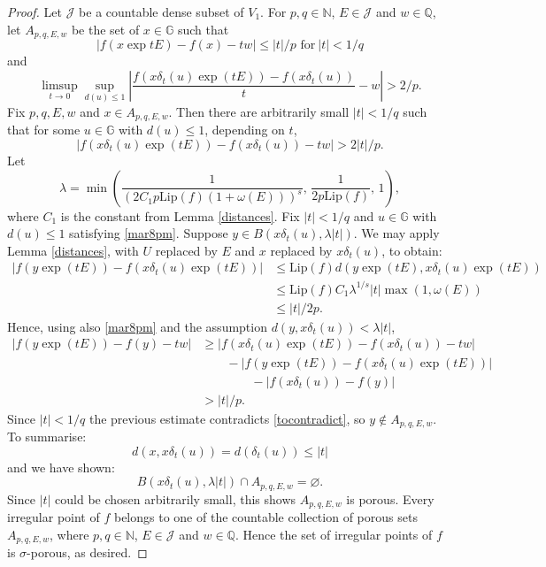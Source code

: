 \documentclass[reqno, 11pt]{amsart}
\theoremstyle{definition}
\theoremstyle{remark}
\numberwithin{theorem}{section}
\numberwithin{equation}{section}
\begin{document}
\begin{proof}
Let $\mathcal{J}$ be a countable dense subset of $V_{1}$. For $p,q\in \mathbb{N}$, $E \in \mathcal{J}$ and $w\in \mathbb{Q}$, let $A_{p,q,E,w}$ be the set of $x\in \mathbb{G}$ such that
\begin{equation}\label{tocontradict} |f(x\exp tE)-f(x)-tw| \leq |t|/p \mbox{ for}\  |t|<1/q\end{equation}
and
\[\limsup_{t\to 0} \sup_{d(u)\leq 1} \left| \frac{f(x\delta_{t}(u)\exp(tE))-f(x\delta_{t}(u))}{t} - w\right| > 2/p.\]
Fix $p,q,E,w$ and $x\in A_{p,q,E,w}$. Then there are arbitrarily small $|t|<1/q$ such that for some $u\in \mathbb{G}$ with $d(u)\leq 1$, depending on $t$,
\begin{equation}\label{mar8pm}|f(x\delta_{t}(u)\exp(tE))-f(x\delta_{t}(u))-tw|>2|t|/p.\end{equation}
Let
\[\lambda=\min \left( \frac{1}{(2C_{1}p\mathrm{Lip}(f)(1+\omega(E)))^{s}},\, \frac{1}{2p\mathrm{Lip}(f)},\, 1\right),\]
where $C_{1}$ is the constant from Lemma \ref{distances}. Fix $|t|<1/q$ and $u\in \mathbb{G}$ with $d(u)\leq 1$ satisfying \eqref{mar8pm}. Suppose $y\in B(x\delta_{t}(u),\lambda|t|)$. We may apply Lemma \ref{distances}, with $U$ replaced by $E$ and $x$ replaced by $x\delta_{t}(u)$, to obtain:
\begin{align*}
|f(y\exp(tE))-f(x\delta_{t}(u)\exp(tE))| &\leq \mathrm{Lip}(f)d(y\exp(tE), x\delta_{t}(u)\exp(tE))\\
&\leq \mathrm{Lip}(f) C_{1} \lambda^{1/s}|t| \max (1, \omega(E))\\
&\leq |t|/2p.
\end{align*}
Hence, using also \eqref{mar8pm} and the assumption $d(y,x\delta_{t}(u))<\lambda |t|$,
\begin{align*}
|f(y\exp(tE))-f(y)-tw| &\geq |f(x\delta_{t}(u)\exp(tE))-f(x\delta_{t}(u))-tw|\\
&\qquad -|f(y\exp(tE))-f(x\delta_t(u)\exp(tE))|\\
&\qquad \qquad -|f(x\delta_t(u))-f(y)|\\ 
&> |t|/p.
\end{align*}
Since $|t|<1/q$ the previous estimate contradicts \eqref{tocontradict}, so $y\notin A_{p,q,E,w}$. To summarise:
\[d(x,x\delta_{t}(u))=d(\delta_{t}(u))\leq |t|\]
and we have shown:
\[B(x\delta_{t}(u),\lambda|t|)\cap A_{p,q,E,w}=\varnothing.\]
Since $|t|$ could be chosen arbitrarily small, this shows $A_{p,q,E,w}$ is porous. Every irregular point of $f$ belongs to one of the countable collection of porous sets $A_{p,q,E,w}$, where $p,q\in \mathbb{N}$, $E \in \mathcal{J}$ and $w\in \mathbb{Q}$. Hence the set of irregular points of $f$ is $\sigma$-porous, as desired.
\end{proof}
\end{document}
